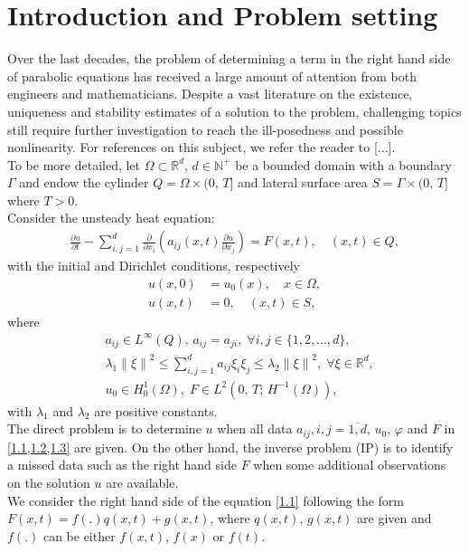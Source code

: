 \documentclass[]{article}
\begin{document}
\section{Introduction and Problem setting}
Over the last decades, the problem of determining a term in the right hand side of parabolic equations has received a large amount of attention from both engineers and mathematicians. Despite a vast literature on the existence, uniqueness and stability estimates of a solution to the problem, challenging topics still require further investigation to reach the ill-posedness and possible nonlinearity. For references on this subject, we refer the reader to [...].\\
To be more detailed, let $\Omega \subset \mathbb{R}^d,\, d\in \mathbb{N^+}$ be a bounded domain with a boundary $\Gamma$ and endow the cylinder $Q=\Omega\times (0,\, T]$ and lateral surface area $S=\Gamma \times (0,\, T]$ where $T>0$. 
\\
Consider the unsteady heat equation:
\begin{align}\label{1.1}
	\frac{\partial u}{\partial t}-\sum_{i, j=1}^{d}\frac{\partial}{\partial x_i}\left(a_{ij}(x, t)\frac{\partial u}{\partial x_j}\right)=F(x, t), \quad(x, t)\in Q,
\end{align}
with the initial and Dirichlet conditions, respectively
\begin{align}
	u(x, 0)&=u_0(x),\quad x\in \Omega,\label{1.2}\\
	u(x, t)&=0,\quad(x, t)\in S, \label{1.3}
\end{align}
where
\begin{align*}
	&a_{ij}\in L^{\infty}(Q),\, a_{ij}=a_{ji},\; \forall i, j\in \{1, 2, ..., d\},\\
	&\lambda_1\left\|\xi\right\|^2\leq \sum_{i, j=1}^{d}a_{ij}\xi_i\xi_j\leq \lambda_2\left\|\xi\right\|^2,\; \forall \xi\in\mathbb{R}^d,\\
	&u_0\in H^1_0(\Omega),\; F\in L^2(0,\, T;\, H^{-1}(\Omega)),
\end{align*}
with $\lambda_1$ and $\lambda_2$ are positive constants.
\\
The direct problem is to determine $u$ when all data $a_{ij}, i, j=\overline{1, d}, \,u_0, \,\varphi$ and $F$ in \cref{1.1,1.2,1.3} are given. On the other hand, the inverse problem (IP) is to identify a missed data such as the right hand side $F$ when some additional observations on the solution $u$ are available. 
\\
We consider the right hand side of the equation \eqref{1.1} following the form $F(x, t)=f(.)q(x, t)+g(x, t)$, where $q(x, t),\, g(x, t)$ are given and $f(.)$ can be either $f(x, t)$, $f(x)$ or $f(t)$.
\end{document}
